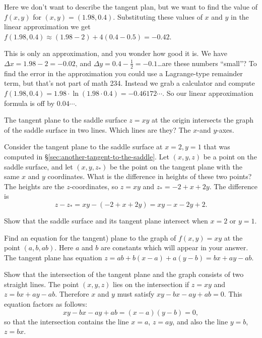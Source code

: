 \begin{multicols}{2}
Here we don't want to describe the tangent plan, but we want to find
the value of $f(x, y)$ for $(x,y) = (1.98, 0.4)$.  Substituting these
values of $x$ and $y$ in the linear approximation we get $f(1.98, 0.4)
\approx (1.98-2) + 4 (0.4-0.5) = -0.42$.

This is only an approximation, and you wonder how good it is.  We have
$\Delta x = 1.98-2 = -0.02$, and $\Delta y = 0.4 - \frac12 =
-0.1$\ldots are these numbers ``small''?  To find the error in the
approximation you could use a Lagrange-type remainder term, but that's
not part of math 234.  Instead we grab a calculator and compute
$f(1.98, 0.4) = 1.98\cdot \ln(1.98\cdot 0.4) = -0.46172\cdots$.  So
our linear approximation formula is off by $0.04\cdots$.

\endanswer
\problem
\subprob The tangent plane to the saddle surface $z=xy$ at the origin intersects
the graph of the saddle surface in two lines.  Which lines are they?
\answer
The $x$-and $y$-axes.
\endanswer

\subprob Consider the tangent plane to the saddle surface at $x=2, y=1$
that was computed in \S\ref{sec:another-tangent-to-the-saddle}.  Let $(x,y,z)$
be a point on the saddle surface, and let $(x,y,z_*)$ be the point on the
tangent plane with the same $x$ and $y$ coordinates.  What is the
difference in heights of these two points?
\answer
The heights are the $z$-coordinates, so $z=xy$ and $z_* = -2+x+2y$.  The
difference is
\[
z-z_* = xy - (-2+x+2y) = xy-x-2y+2.
\]
\endanswer

\subprob Show that the saddle surface and its tangent plane intersect when $x=2$
or $y=1$.

\problem
\subprob Find an equation for the tangent) plane to the graph of
$f(x, y) = xy$ at the point $(a, b, ab)$.  Here $a$ and $b$ are
constants which will appear in your answer.
\answer The tangent plane has equation $z=
ab +b(x-a) + a(y-b) = bx+ay-ab$.
\endanswer

\subprob Show that the intersection of the tangent plane and the graph
consists of two straight lines.
\answer The point $(x, y, z)$ lies on the intersection if $z=xy$ and
$z=bx+ay-ab$.  Therefore $x$ and $y$ must satisfy 
$xy-bx-ay+ab = 0$.  This equation factors as follows:
\[
xy-bx-ay+ab = (x-a)(y-b) =0,
\]
so that the intersection contains the line $x=a$, $z=ay$, and
also the line $y=b$, $z=bx$.
\endanswer



\end{multicols}


